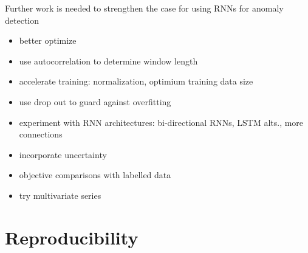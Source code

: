 \documentclass{beamer}
\begin{document}
    \begin{frame}{Further work is needed to strengthen the case for using RNNs for anomaly detection}
      \begin{itemize}
        \item better optimize
        \item use autocorrelation to determine window length
        \item accelerate training: normalization, optimium training data size
        \item use drop out to guard against overfitting
        \item experiment with RNN architectures: bi-directional RNNs, LSTM alts., more connections
        \item incorporate uncertainty
        \item objective comparisons with labelled data
        \item try multivariate series
      \end{itemize}
        
    \end{frame}


    \section{Reproducibility}
\end{document}
